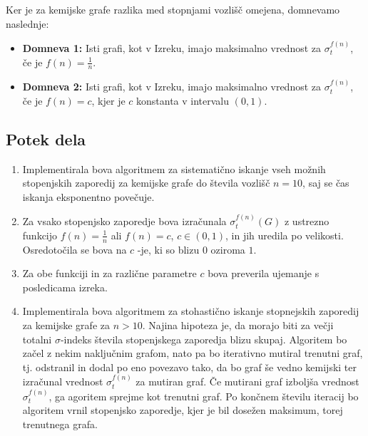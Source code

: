 \documentclass{article}
\begin{document}
Ker je za kemijske grafe razlika med stopnjami vozlišč omejena, domnevamo naslednje: 

\begin{itemize}
    \item \textbf{Domneva 1:} Isti grafi, kot v Izreku, imajo maksimalno vrednost za $\sigma_t^{f(n)}$, če je $f(n) = \frac{1}{n}$. 
    \item \textbf{Domneva 2:} Isti grafi, kot v Izreku, imajo maksimalno vrednost za $\sigma_t^{f(n)}$, če je $f(n) = c$, kjer je $c$ konstanta v intervalu $(0, 1)$. 

\end{itemize}


\subsection*{Potek dela}


\begin{enumerate}
    \item Implementirala bova algoritmem za sistematično iskanje vseh možnih stopenjskih zaporedij za 
    kemijske grafe do števila vozlišč $n=10$, saj se čas iskanja eksponentno povečuje.
    \item Za vsako stopenjsko zaporedje bova izračunala $\sigma_t^{f(n)}(G)$ z ustrezno funkcijo $f(n)= \frac{1}{n}$
     ali $f(n)= c$, $c \in (0,1)$, in jih uredila po velikosti. Osredotočila se bova na $c$ -je, ki so blizu $0$ oziroma $1$.
    \item Za obe funkciji in za različne parametre $c$ bova preverila ujemanje s 
    posledicama izreka. 
    \item Implementirala bova algoritmem za stohastično iskanje stopnejskih zaporedij za kemijske grafe za $n>10$.
    Najina hipoteza je, da morajo biti za večji totalni $\sigma$-indeks števila stopenjskega zaporedja blizu skupaj. 
    Algoritem bo začel z nekim naključnim grafom, nato pa bo iterativno mutiral trenutni graf, tj. odstranil in dodal po eno povezavo tako, da bo graf še vedno kemijski
    ter izračunal vrednost $\sigma_t^{f(n)}$ za mutiran graf.
    Če mutirani graf izboljša vrednost $\sigma_t^{f(n)}$, ga agoritem sprejme kot trenutni graf.
    Po končnem številu iteracij bo algoritem vrnil stopenjsko zaporedje, kjer je bil dosežen maksimum, torej trenutnega grafa.

\end{enumerate}
\end{document}
